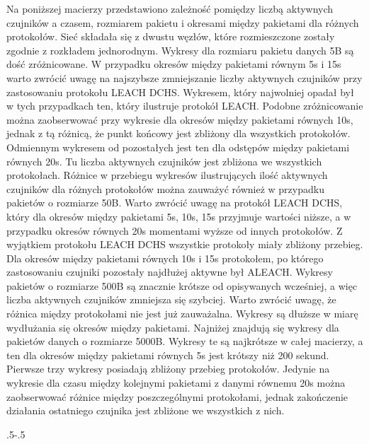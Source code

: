 Na poniższej macierzy przedstawiono zależność pomiędzy liczbą aktywnych czujników a czasem, rozmiarem pakietu i okresami między pakietami dla różnych protokołów. Sieć składała się z dwustu węzłów, które rozmieszczone zostały zgodnie z rozkładem jednorodnym.
Wykresy dla rozmiaru pakietu danych 5B są dość zróżnicowane. W przypadku okresów między pakietami równym 5s i 15s warto zwrócić uwagę na najszybsze zmniejszanie liczby aktywnych czujników przy zastosowaniu protokołu LEACH DCHS. Wykresem, który najwolniej opadał był w tych przypadkach ten, który ilustruje protokół LEACH. Podobne zróżnicowanie można zaobserwować przy wykresie dla okresów między pakietami równych 10s, jednak z tą różnicą, że punkt końcowy jest zbliżony dla wszystkich protokołów. Odmiennym wykresem od pozostałych jest ten dla odstępów między pakietami równych 20s. Tu liczba aktywnych czujników jest zbliżona we wszystkich protokołach. 
Różnice w przebiegu wykresów ilustrujących ilość aktywnych czujników dla różnych protokołów można zauważyć również w przypadku pakietów o rozmiarze 50B. Warto zwrócić uwagę na protokół LEACH DCHS, który dla okresów między pakietami 5s, 10s, 15s przyjmuje wartości niższe, a w przypadku okresów równych 20s momentami wyższe od innych protokołów.  Z wyjątkiem protokołu LEACH DCHS wszystkie protokoły miały zbliżony przebieg. Dla okresów między pakietami równych 10s i 15s protokołem, po którego zastosowaniu czujniki pozostały najdłużej aktywne był ALEACH. 
Wykresy pakietów o rozmiarze 500B są znacznie krótsze od opisywanych wcześniej, a więc liczba aktywnych czujników zmniejsza się szybciej. Warto zwrócić uwagę, że różnica między protokołami nie jest już zauważalna. Wykresy są dłuższe w miarę wydłużania się okresów między pakietami.
Najniżej znajdują się wykresy dla pakietów danych o rozmiarze 5000B. Wykresy te są najkrótsze w całej macierzy, a ten dla okresów między pakietami równych 5s jest krótszy niż 200 sekund. Pierwsze trzy wykresy posiadają zbliżony przebieg protokołów. Jedynie na wykresie dla czasu między kolejnymi pakietami z danymi równemu 20s można zaobserwować różnice między poszczególnymi protokołami, jednak zakończenie działania ostatniego czujnika jest zbliżone we wszystkich z nich.


\clearpage
\thispagestyle{empty}

{\pdfpagewidth
    \vspace*{-2cm}
    \noindent\kern.5\pdfpagewidth{}\kern-.5\pdfpagewidth
     \par
     \vspace*{-5cm}
\clearpage
}


